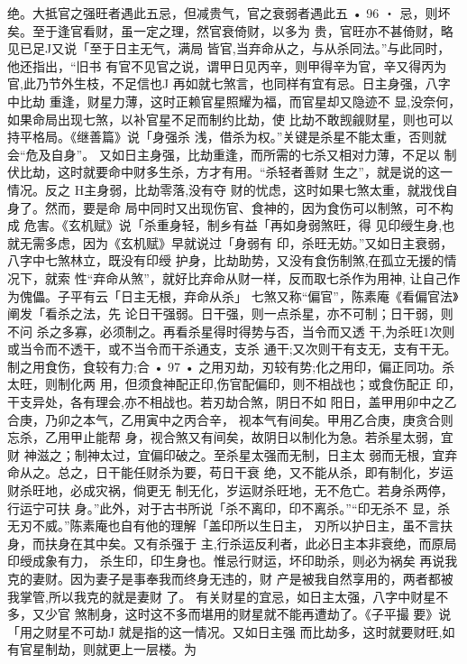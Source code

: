 绝。大抵官之强旺者遇此五忌，但减贵气，官之衰弱者遇此五
• 96 ・
忌，则坏矣。至于逢官看财，虽一定之理，然官衰倚财，以多为
贵，官旺亦不甚倚财，略见已足J又说「至于日主无气，满局
皆官,当弃命从之，与从杀同法。”与此同时，他还指出，“旧书
有官不见官之说，谓甲日见丙辛，则甲得辛为官，辛又得丙为
官,此乃节外生枝，不足信也J
再如就七煞言，也同样有宜有忌。日主身强，八字中比劫
重逢，财星力薄，这时正赖官星照耀为福，而官星却又隐迹不
显,没奈何，如果命局出现七煞，以补官星不足而制约比劫，使
比劫不敢觊觎财星，则也可以持平格局。《继善篇》说「身强杀
浅，借杀为权。”关键是杀星不能太重，否则就会“危及自身”。
又如日主身强，比劫重逢，而所需的七杀又相对力薄，不足以
制伏比劫，这时就要命中财多生杀，方才有用。“杀轻者善财
生之”，就是说的这一情况。反之 H主身弱，比劫零落,没有夺
财的忧虑，这时如果七煞太重，就戕伐自身了。然而，要是命
局中同时又出现伤官、食神的，因为食伤可以制煞，可不构成
危害。《玄机赋》说「杀重身轻，制乡有益「再如身弱煞旺，得
见印绶生身,也就无需多虑，因为《玄机赋》早就说过「身弱有
印，杀旺无妨。”又如日主衰弱，八字中七煞林立，既没有印绶
护身，比劫助势，又没有食伤制煞,在孤立无援的情况下，就索
性“弃命从煞”，就好比弃命从财一样，反而取七杀作为用神,
让自己作为傀儡。子平有云「日主无根，弃命从杀」
七煞又称“偏官”，陈素庵《看偏官法》阐发「看杀之法，先
论日干强弱。日干强，则一点杀星，亦不可制；日干弱，则不问
杀之多寡，必须制之。再看杀星得时得势与否，当令而又透
干,为杀旺1次则或当令而不透干，或不当令而干杀通支，支杀
通干;又次则干有支无，支有干无。制之用食伤，食较有力;合
• 97 •
之用刃劫，刃较有势;化之用印，偏正同功。杀太旺，则制化两
用，但须食神配正印,伤官配偏印，则不相战也；或食伤配正
印，干支异处，各有理会,亦不相战也。若刃劫合煞，阴日不如
阳日，盖甲用卯中之乙合庚，乃卯之本气，乙用寅中之丙合辛，
视本气有间矣。甲用乙合庚，庚贪合则忘杀，乙用甲止能帮
身，视合煞又有间矣，故阴日以制化为急。若杀星太弱，宜财
神滋之；制神太过，宜偏印破之。至杀星太强而无制，日主太
弱而无根，宜弃命从之。总之，日干能任财杀为要，苟日干衰
绝，又不能从杀，即有制化，岁运财杀旺地，必成灾祸，倘更无
制无化，岁运财杀旺地，无不危亡。若身杀两停，行运宁可扶
身。”此外，对于古书所说「杀不离印，印不离杀。”“印无杀不
显，杀无刃不威。”陈素庵也自有他的理解「盖印所以生日主，
刃所以护日主，虽不言扶身，而扶身在其中矣。又有杀强于
主,行杀运反利者，此必日主本非衰绝，而原局印绶成象有力，
杀生印，印生身也。惟忌行财运，坏印助杀，则必为祸矣
再说我克的妻财。因为妻子是事奉我而终身无违的，财
产是被我自然享用的，两者都被我掌管,所以我克的就是妻财
了。
有关财星的宜忌，如日主太强，八字中财星不多，又少官
煞制身，这时这不多而堪用的财星就不能再遭劫了。《子平撮
要》说「用之财星不可劫J 就是指的这一情况。又如日主强
而比劫多，这时就要财旺,如有官星制劫，则就更上一层楼。为
